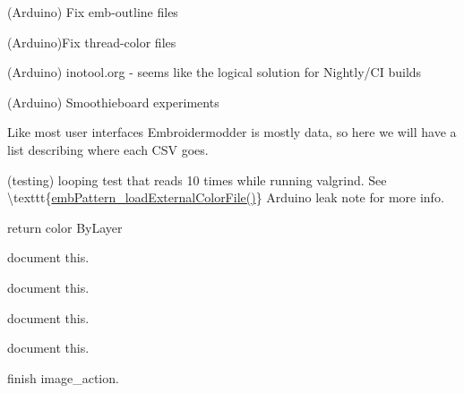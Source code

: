 \begin{DoxyRefList}
\label{todo__todo000252}%
%
(Arduino) Fix emb-\/outline files

\label{todo__todo000253}%
%
(Arduino)Fix thread-\/color files

\label{todo__todo000255}%
%
(Arduino) inotool.\+org -\/ seems like the logical solution for Nightly/\+CI builds

\label{todo__todo000256}%
%
(Arduino) Smoothieboard experiments

\label{todo__todo000258}%
%
Like most user interfaces Embroidermodder is mostly data, so here we will have a list describing where each CSV goes.

\label{todo__todo000257}%
%
(testing) looping test that reads 10 times while running valgrind. See \textbackslash{}texttt\{\mbox{\hyperlink{embroidery_8h_a3bf191bd99e2da8d36465f454a4646f6}{emb\+Pattern\+\_\+load\+External\+Color\+File()}}\} Arduino leak note for more info. 
\item[Member \mbox{\hyperlink{imgui__main_8c_adcae0cbecb600049c6dedd95cd9930cd}{get\+Current\+Color}} (void)]\label{todo__todo000176}%
%
return color By\+Layer  
\item[Member \mbox{\hyperlink{imgui__main_8c_ab3b613d0d567021e164a02be665b5400}{grid\+\_\+color\+\_\+action}} (void)]\label{todo__todo000128}%
%
document this.  
\item[Member \mbox{\hyperlink{imgui__main_8c_a61193ac4a9ec8dd4bc18dced3c4a3abd}{heart\+\_\+init}} (void)]\label{todo__todo000214}%
%
document this.  
\item[Member \mbox{\hyperlink{imgui__main_8c_a80a32bba36fcac6f698e1036d5291c31}{Help}} (void)]\label{todo__todo000183}%
%
document this.  
\item[Member \mbox{\hyperlink{imgui__main_8c_af6ea106335ef929038c6a971fe45e764}{horizontal\+\_\+dimension\+\_\+action}} (void)]\label{todo__todo000190}%
%
document this.  
\item[Member \mbox{\hyperlink{imgui__main_8c_a522cad9c8b9672f085d6f3ffc0f6d67f}{image\+\_\+action}} (void)]\label{todo__todo000192}%
%
finish image\+\_\+action.  
\item[Member \mbox{\hyperlink{imgui__main_8c_a6e4c300aad52822a324a91edae2235b6}{Index}} ]\label{todo__todo000004}%

\end{DoxyRefList}
